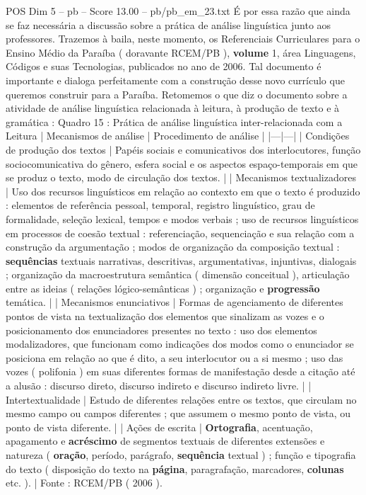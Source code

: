 \begin{textsample}{POS Dim 5 – pb – Score 13.00 – pb/pb\_em\_23.txt}
É por essa razão que ainda se faz necessária a discussão sobre a prática de análise linguística junto aos professores.
Trazemos à baila, neste momento, os Referenciais Curriculares para o Ensino Médio da Paraíba ( doravante RCEM/PB ), \textbf{volume} 1, área Linguagens, Códigos e suas Tecnologias, publicados no ano de 2006.
Tal documento é importante e dialoga perfeitamente com a construção desse novo currículo que queremos construir para a Paraíba.
Retomemos o que diz o documento sobre a atividade de análise linguística relacionada à leitura, à produção de texto e à gramática : Quadro 15 : Prática de análise linguística inter-relacionada com a Leitura | Mecanismos de análise | Procedimento de análise | |---|---| | Condições de produção dos textos | Papéis sociais e comunicativos dos interlocutores, função sociocomunicativa do gênero, esfera social e os aspectos espaço-temporais em que se produz o texto, modo de circulação dos textos. | | Mecanismos textualizadores | Uso dos recursos linguísticos em relação ao contexto em que o texto é produzido : elementos de referência pessoal, temporal, registro linguístico, grau de formalidade, seleção lexical, tempos e modos verbais ; uso de recursos linguísticos em processos de coesão textual : referenciação, sequenciação e sua relação com a construção da argumentação ; modos de organização da composição textual : \textbf{sequências} textuais narrativas, descritivas, argumentativas, injuntivas, dialogais ; organização da macroestrutura semântica ( dimensão conceitual ), articulação entre as ideias ( relações lógico-semânticas ) ; organização e \textbf{progressão} temática. | | Mecanismos enunciativos | Formas de agenciamento de diferentes pontos de vista na textualização dos elementos que sinalizam as vozes e o posicionamento dos enunciadores presentes no texto : uso dos elementos modalizadores, que funcionam como indicações dos modos como o enunciador se posiciona em relação ao que é dito, a seu interlocutor ou a si mesmo ; uso das vozes ( polifonia ) em suas diferentes formas de manifestação desde a citação até a alusão : discurso direto, discurso indireto e discurso indireto livre. | | Intertextualidade | Estudo de diferentes relações entre os textos, que circulam no mesmo campo ou campos diferentes ; que assumem o mesmo ponto de vista, ou ponto de vista diferente. | | Ações de escrita | \textbf{Ortografia}, acentuação, apagamento e \textbf{acréscimo} de segmentos textuais de diferentes extensões e natureza ( \textbf{oração}, período, parágrafo, \textbf{sequência} textual ) ; função e tipografia do texto ( disposição do texto na \textbf{página}, paragrafação, marcadores, \textbf{colunas} etc. ). | Fonte : RCEM/PB ( 2006 ).

\end{textsample}
